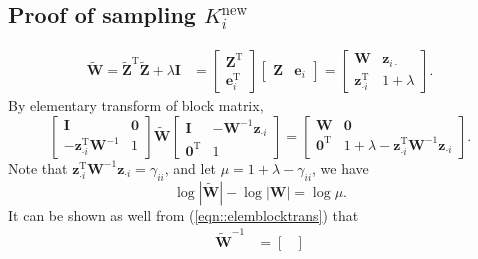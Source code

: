 \documentclass{article}
\begin{document}
\begin{appendices}
  \subsection{Proof of sampling $K_i^\text{new}$}\label{app::proof2}
    $$
    \begin{aligned}
      \widetilde{\mathbf{W}} = {\widetilde{\mathbf{Z}}}^{\mathrm{T}}\widetilde{\mathbf{Z}} + \lambda \mathbf{I} &= \begin{bmatrix}
        {\mathbf{Z}}^{\mathrm{T}} \\ {\boldsymbol{e}}_i^{\mathrm{T}}
      \end{bmatrix} \begin{bmatrix}
        \mathbf{Z} & \boldsymbol{e}_i
      \end{bmatrix} = 
      \begin{bmatrix}
        \mathbf{W} & \boldsymbol{z}_{i \cdot} \\
        {\boldsymbol{z}}_{\cdot i}^{\mathrm{T}} & 1 + \lambda
      \end{bmatrix}.
    \end{aligned}
    $$
    By elementary transform of block matrix, 
    \begin{equation}
      \begin{bmatrix}
      \mathbf{I} & \boldsymbol{0} \\ -{\boldsymbol{z}}_{\cdot i}^{\mathrm{T}} \mathbf{W}^{-1} & 1
    \end{bmatrix}\widetilde{\mathbf{W}}
    \begin{bmatrix}
      \mathbf{I} & -\mathbf{W}^{-1}{\boldsymbol{z}}_{\cdot i}  \\ \boldsymbol{0}^\mathrm{T} & 1
    \end{bmatrix} = \begin{bmatrix}
      \mathbf{W} & \boldsymbol{0} \\ {\boldsymbol{0}}^{\mathrm{T}} & 1 + \lambda - {\boldsymbol{z}}_{\cdot i}^{\mathrm{T}} \mathbf{W}^{-1}{\boldsymbol{z}}_{\cdot i}
    \end{bmatrix}.
    \label{eqn::elemblocktrans}
    \end{equation}
    Note that ${\boldsymbol{z}}_{\cdot i}^{\mathrm{T}} \mathbf{W}^{-1}{\boldsymbol{z}}_{\cdot i} = \gamma_{ii}$, and let $\mu = 1 + \lambda - \gamma_{ii}$, we have
    $$\log |\widetilde{\mathbf{W}}| - \log|\mathbf{W}| = \log \mu.$$
    It can be shown as well from (\ref{eqn::elemblocktrans}) that 
    $$\begin{aligned}
      \widetilde{\mathbf{W}}^{-1} &= \begin{bmatrix}

\end{bmatrix}
\end{aligned}$$
\end{appendices}
\end{document}
